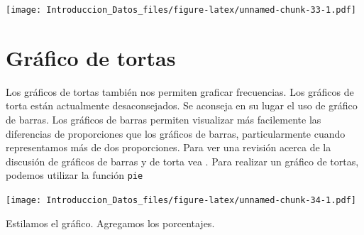 \documentclass[spanish,]{book}
\newenvironment{Shaded}{\begin{snugshade}}{\end{snugshade}}
\newcommand{\KeywordTok}[1]{\textcolor[rgb]{0.13,0.29,0.53}{\textbf{#1}}}
\newcommand{\DataTypeTok}[1]{\textcolor[rgb]{0.13,0.29,0.53}{#1}}
\newcommand{\StringTok}[1]{\textcolor[rgb]{0.31,0.60,0.02}{#1}}
\newcommand{\OperatorTok}[1]{\textcolor[rgb]{0.81,0.36,0.00}{\textbf{#1}}}
\newcommand{\NormalTok}[1]{#1}
\begin{document}
\texttt{[image: Introduccion\_Datos\_files/figure-latex/unnamed-chunk-33-1.pdf]}

\section{Gráfico de tortas}\label{grafico-de-tortas}

Los gráficos de tortas también nos permiten graficar frecuencias. Los
gráficos de torta están actualmente desaconsejados. Se aconseja en su
lugar el uso de gráfico de barras. Los gráficos de barras permiten
visualizar más facilemente las diferencias de proporciones que los
gráficos de barras, particularmente cuando representamos más de dos
proporciones. Para ver una revisión acerca de la discusión de gráficos
de barras y de torta vea \citet{spence2005no}. Para realizar un gráfico
de tortas, podemos utilizar la función \texttt{pie}

\begin{Shaded}
\end{Shaded}

\texttt{[image: Introduccion\_Datos\_files/figure-latex/unnamed-chunk-34-1.pdf]}

Estilamos el gráfico. Agregamos los porcentajes.
\end{document}
